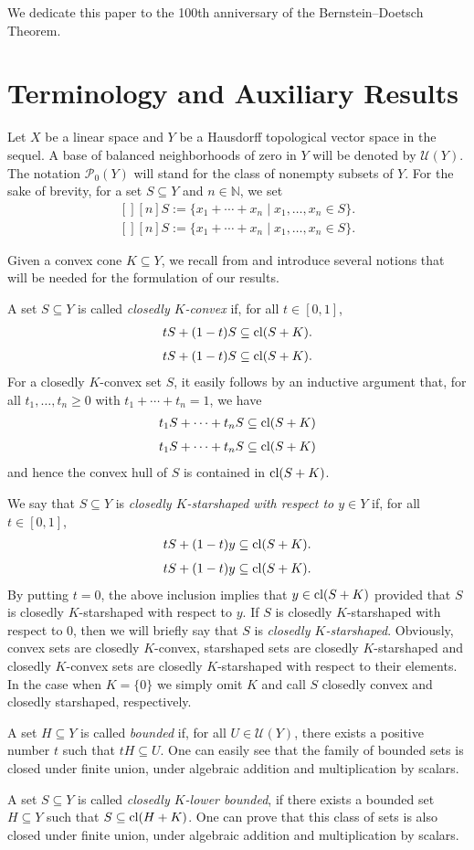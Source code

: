 \documentclass[12pt,reqno]{amsart}
\newcommand{\N}{\mathbb{N}}
\renewcommand{\P}{\mathscr{P}}
\newcommand{\U}{\mathscr{U}}
\newcommand{\cl}{\mathop{\hbox{\rm cl}}\nolimits}
\theoremstyle{definition}
\def\Eq#1#2{\ifthenelse{\equal{#1}{*}}
  {\begin{equation*}\begin{aligned}[]#2\end{aligned}\end{equation*}}
  {\begin{equation}\begin{aligned}[]\label{E#1}#2\end{aligned}\end{equation}}}
\begin{document}
We dedicate this paper to the 100th anniversary of the Bernstein--Doetsch Theorem.


\section{Terminology and Auxiliary Results}
\setcounter{theorem}{0}

Let $X$ be a linear space and $Y$ be a Hausdorff topological vector space in the sequel.
A base of balanced neighborhoods of zero in $Y$ will be denoted by $\U(Y)$. The notation $\P_0(Y)$ will stand 
for the class of nonempty subsets of $Y$. For the sake of brevity, for a set $S\subseteq Y$ and
$n\in\N$, we set
\Eq{*}{
  [n]S:=\{x_1+\cdots+x_n\mid x_1,\dots,x_n\in S\}.
}

Given a convex cone $K\subseteq Y$, we recall from \cite{GonNikPalRoa14} and introduce several 
notions that will be needed for the formulation of our results.

A set $S\subseteq Y$ is called \emph{closedly $K$-convex} if, for all $t\in[0,1]$,
\Eq{*}{
  tS+(1-t)S\subseteq \cl(S+K).
}
For a closedly $K$-convex set $S$, it easily follows by an inductive argument that, for all $t_1,\dots,t_n\geq0$ with 
$t_1+\cdots+t_n=1$, we have
\Eq{*}{
  t_1S+\cdots+t_nS\subseteq \cl(S+K)
}
and hence the convex hull of $S$ is contained in $\cl(S+K)$.

We say that $S\subseteq Y$ is \emph{closedly $K$-starshaped with respect to $y\in Y$} if,
for all $t\in[0,1]$,
\Eq{*}{
  tS+(1-t)y\subseteq \cl(S+K).
}
By putting $t=0$, the above inclusion implies that $y\in\cl(S+K)$ provided that $S$ is closedly $K$-starshaped with 
respect to $y$. If $S$ is closedly $K$-starshaped with respect to $0$, then we will briefly say that $S$ is 
\textit{closedly $K$-starshaped}. Obviously, convex sets are closedly $K$-convex, starshaped sets are closedly 
$K$-starshaped and closedly $K$-convex sets are closedly $K$-starshaped with respect to their elements.
In the case when $K=\{0\}$ we simply omit $K$ and call $S$ closedly convex and closedly starshaped, respectively.

A set $H\subseteq Y$ is called \emph{bounded} if, for all $U\in\U(Y)$, there exists a positive number
$t$ such that $tH\subseteq U$. One can easily see that the family of bounded sets is closed under
finite union, under algebraic addition and multiplication by scalars. 

A set $S\subseteq Y$ is called \emph{closedly $K$-lower bounded}, if there exists a bounded set 
$H\subseteq Y$ such that $S\subseteq\cl(H+K)$. One can prove that this class of sets
is also closed under finite union, under algebraic addition and multiplication by scalars.
\end{document}
